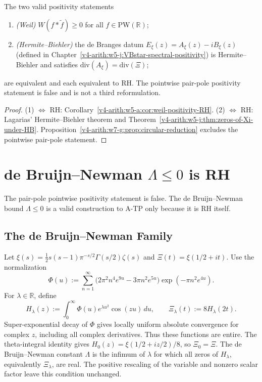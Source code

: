 \begin{corollary}
\label{v4-arith:w7-g:cor:three-constructions-equivalent}
The two valid positivity statements
\begin{enumerate}
\item \emph{(Weil)} \(W(f*\widetilde{f})\geq 0\) for all
\(f\in\mathrm{PW}(\mathbb{R})\);
\item \emph{(Hermite--Biehler)} the de Branges datum
\(E_{\xi}(z)=A_{\xi}(z)-iB_{\xi}(z)\) (defined in
Chapter~\ref{v4-arith:w5-j:VBstar-spectral-positivity}) is
Hermite--Biehler and satisfies
\(\mathrm{div}(A_{\xi})=\mathrm{div}(\Xi)\);
\end{enumerate}
are equivalent and each equivalent to RH. The pointwise pair-pole
positivity statement is false and is not a third reformulation.
\end{corollary}

\begin{proof}
(1) \(\Leftrightarrow\) RH: Corollary~\ref{v4-arith:w5-a:cor:weil-positivity-RH}.
(2) \(\Leftrightarrow\) RH: Lagarias' Hermite--Biehler theorem and
Theorem~\ref{v4-arith:w5-j:thm:zeros-of-Xi-under-HB}.
Proposition~\ref{v4-arith:w7-g:prop:circular-reduction} excludes the pointwise
pair-pole statement.
\end{proof}

\section{de Bruijn--Newman \(\Lambda\leq 0\) is RH}
\label{v4-arith:w7-g:de-Bruijn-Newman}

The pair-pole pointwise positivity statement is false. The
de Bruijn--Newman bound \(\Lambda\leq 0\) is a valid construction to A-TP
only because it is RH itself.

\subsection{The de Bruijn--Newman Family}
\label{v4-arith:w7-g:de-Bruijn-Newman:family}

\begin{definition}
\label{v4-arith:w7-g:def:dBN-family}
Let \(\xi(s)=\tfrac12s(s-1)\pi^{-s/2}\Gamma(s/2)\zeta(s)\)
and \(\Xi(t)=\xi(1/2+it)\). Use the normalization
\begin{equation}
\label{v4-arith:w7-g:eq:Phi}
\Phi(u):=\sum_{n=1}^{\infty}
\bigl(2\pi^2n^4e^{9u}-3\pi n^2e^{5u}\bigr)
\exp(-\pi n^2e^{4u}).
\end{equation}
For \(\lambda\in\mathbb R\), define
\[
H_\lambda(z):=\int_0^\infty\Phi(u)e^{\lambda u^2}\cos(zu)\,du,
\qquad \Xi_\lambda(t):=8H_\lambda(2t).
\]
Super-exponential decay of \(\Phi\) gives locally uniform absolute
convergence for complex \(z\), including all complex derivatives.
Thus these functions are entire. The theta-integral identity gives
\(H_0(z)=\xi(1/2+iz/2)/8\), so \(\Xi_0=\Xi\).
The de Bruijn--Newman constant \(\Lambda\) is the infimum of
\(\lambda\) for which all zeros of \(H_\lambda\), equivalently
\(\Xi_\lambda\), are real. The positive rescaling of the variable
and nonzero scalar factor leave this condition unchanged.
\end{definition}

